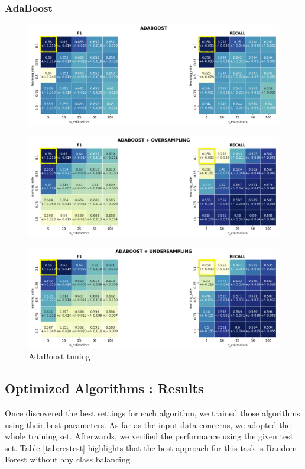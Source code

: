 \documentclass{article}
\begin{document}
	\subsubsection{AdaBoost}
	\begin{figure}[H]
		\centering
		\includegraphics[width=.7\textwidth]{clf_img/Adaboost.png}
	\end{figure}
	\begin{figure}[H]
		\centering
		\includegraphics[width=.7\textwidth]{clf_img/Adaboost_OS.png}
	\end{figure}
	\begin{figure}[H]
		\centering
		\includegraphics[width=.7\textwidth]{clf_img/Adaboost_US.png}
		\caption{AdaBoost tuning}
		\label{fig:hyper_ada}
	\end{figure}
	
	
	\subsection{Optimized Algorithms : Results}
	Once discovered the best settings for each algorithm, we trained those algorithms using their best parameters. As far as the input data concerns, we adopted the whole training set. Afterwards, we verified the performance using the given test set. Table \ref{tab:restest} highlights that the best approach for this task is Random Forest without any class balancing. 
	
\end{document}

